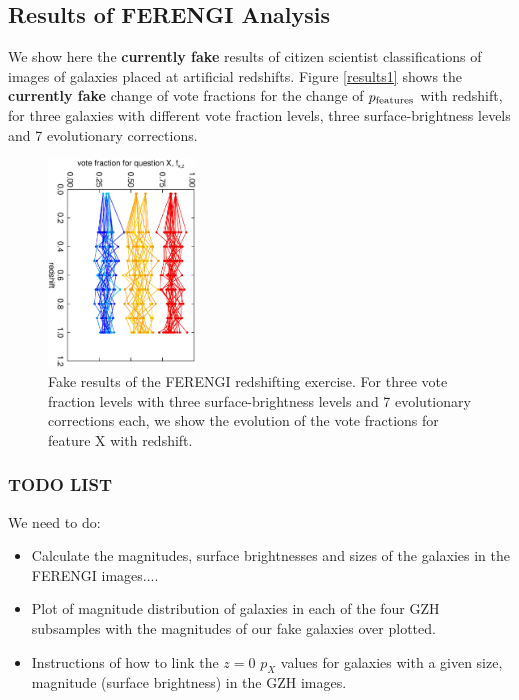 \documentclass[usenatbib]{mn2e}
\begin{document}
 

\subsection{Results of FERENGI Analysis}

We show here the {\bf currently fake} results of citizen scientist classifications of images of galaxies placed at artificial redshifts. Figure \ref{results1} shows the {\bf currently fake} change of vote fractions for the change of $p_{\rm features}$ with redshift, for three galaxies with different vote fraction levels, three surface-brightness levels and 7 evolutionary corrections. 

\begin{figure}
\begin{center}

\includegraphics[width=0.35\textwidth,angle=90]{fake_results.ps}

\caption{Fake results of the FERENGI redshifting exercise. For three vote fraction levels with three surface-brightness levels and 7 evolutionary corrections each, we show the evolution of the vote fractions for feature X with redshift.}

\label{fig:ferengi_results_fake}

\end{center}
\end{figure}

\subsubsection{TODO LIST}
We need to do: 
\begin{itemize}
\item Calculate the magnitudes, surface brightnesses and sizes of the galaxies in the FERENGI images....
\item Plot of magnitude distribution of galaxies in each of the four GZH subsamples with the magnitudes of our fake galaxies over plotted. 
\item Instructions of how to link the $z=0$ $p_X$ values for galaxies with a given size, magnitude (surface brightness) in the GZH images. 
\end{itemize}
\end{document}
